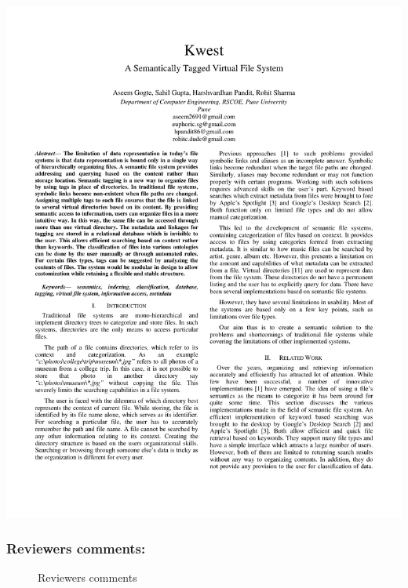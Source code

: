 \includegraphics[page=1,scale=0.75]
{./appendix/sem1.pdf}


\subsubsection{Reviewers comments:}
\begin{figure}[!h]
\centering
\setlength\fboxsep{0pt}
\setlength\fboxrule{0.5pt}
\caption{Reviewers comments}
\label{fig:RC2}
\end{figure}
